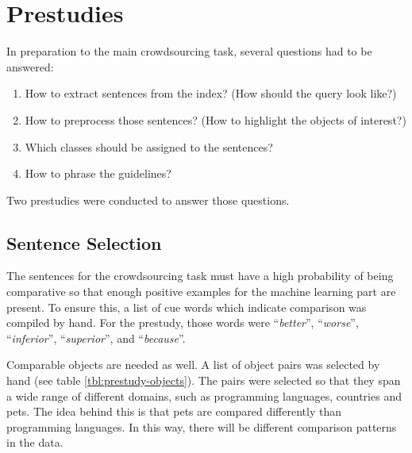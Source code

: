 \section{Prestudies}
In preparation to the main crowdsourcing task, several questions had to be answered:
\begin{enumerate}
\item How to extract sentences from the index? (How should the query look like?)
\item How to preprocess those sentences? (How to highlight the objects of interest?)
\item Which classes should be assigned to the sentences?
\item How to phrase the guidelines?
\end{enumerate}

Two prestudies were conducted to answer those questions.



\subsection{Sentence Selection}
The sentences for the crowdsourcing task must have a high probability of being comparative so that enough positive examples for the machine learning part are present. To ensure this, a list of cue words which indicate comparison was compiled by hand. For the prestudy, those words were \enquote{\emph{better}}, \enquote{\emph{worse}}, \enquote{\emph{inferior}}, \enquote{\emph{superior}}, and \enquote{\emph{because}}. 

Comparable objects are needed as well. A list of object pairs was selected by hand (see table \ref{tbl:prestudy-objects}). The pairs were selected so that they span a wide range of different domains, such as programming languages, countries and pets. The idea behind this is that pets are compared differently than programming languages. In this way, there will be different comparison patterns in the data.

